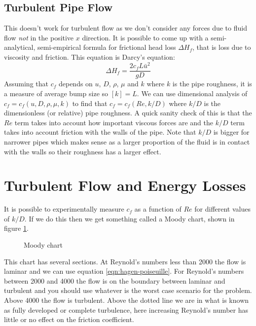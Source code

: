 \documentclass{article}
\begin{document}
    \subsection{Turbulent Pipe Flow}
    This doesn't work for turbulent flow as we don't consider any forces due to fluid flow \emph{not} in the positive \(x\) direction.
    It is possible to come up with a semi-analytical, semi-empirical formula for frictional head loss \(\Delta H_f\), that is loss due to viscosity and friction.
    This equation is Darcy's equation:
    \begin{equation}\label{eqn:darcy}
        \Delta H_f = \frac{2c_fL\bar u^2}{gD}
    \end{equation}
    Assuming that \(c_f\) depends on \(u\), \(D\), \(\rho\), \(\mu\) and \(k\) where \(k\) is the pipe roughness, it is a measure of average bump size so \([k] = L\). 
    We can use dimensional analysis of \(c_f = c_f(u, D, \rho, \mu, k)\) to find that \(c_f = c_f(Re, k/D)\) where \(k/D\) is the dimensionless (or relative) pipe roughness.
    A quick sanity check of this is that the \(Re\) term takes into account how important viscous forces are and the \(k/D\) term takes into account friction with the walls of the pipe.
    Note that \(k/D\) is bigger for narrower pipes which makes sense as a larger proportion of the fluid is in contact with the walls so their roughness has a larger effect.
    
    \section{Turbulent Flow and Energy Losses}
    It is possible to experimentally measure \(c_f\) as a function of \(Re\) for different values of \(k/D\).
    If we do this then we get something called a Moody chart, shown in figure \ref{fig:moody chart}.
    \begin{figure}[ht]
        \centering
        \caption{Moody chart}
        \label{fig:moody chart}
    \end{figure}
    This chart has several sections. 
    At Reynold's numbers less than 2000 the flow is laminar and we can use equation \ref{eqn:hagen-poiseuille}.
    For Reynold's numbers between 2000 and 4000 the flow is on the boundary between laminar and turbulent and you should use whatever is the worst case scenario for the problem.
    Above 4000 the flow is turbulent.
    Above the dotted line we are in what is known as fully developed or complete turbulence, here increasing Reynold's number has little or no effect on the friction coefficient.
    
\end{document}
